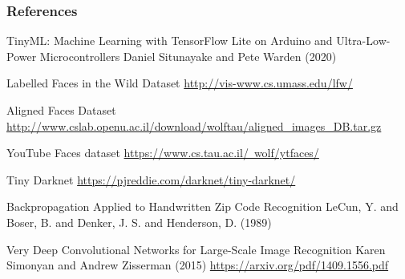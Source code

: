 \documentclass{beamer}
\begin{document}
\begin{frame}
    \frametitle{References}
    \footnotesize{
    \begin{thebibliography}{99} 
         TinyML: Machine Learning with TensorFlow Lite on Arduino and Ultra-Low-Power Microcontrollers
        \newblock Daniel Situnayake and Pete Warden (2020)
        
         Labelled Faces in the Wild Dataset
        \newblock \hyperlink{Source}{http://vis-www.cs.umass.edu/lfw/}
        
         Aligned Faces Dataset
        \newblock \hyperlink{Source}{http://www.cslab.openu.ac.il/download/wolftau/aligned_images_DB.tar.gz}
        
         YouTube Faces dataset 
        \newblock \hyperlink{Source}{https://www.cs.tau.ac.il/~wolf/ytfaces/}
        
         Tiny Darknet
        \newblock \hyperlink{Source}{https://pjreddie.com/darknet/tiny-darknet/}
        
         Backpropagation Applied to Handwritten Zip Code Recognition
        \newblock LeCun, Y. and Boser, B. and Denker, J. S. and Henderson, D. (1989)
        
         Very Deep Convolutional Networks for Large-Scale Image Recognition
        \newblock Karen Simonyan and Andrew Zisserman (2015)
        \hyperlink{Source}{https://arxiv.org/pdf/1409.1556.pdf}

    \end{thebibliography}
    }
\end{frame}

\end{document}
